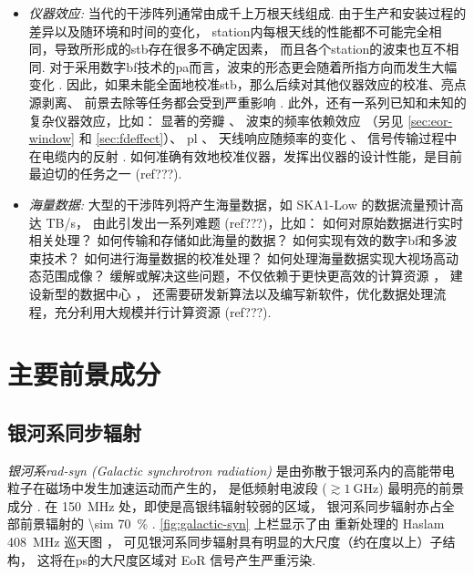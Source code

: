 \begin{itemize}
\item
\emph{仪器效应:}
当代的干涉阵列通常由成千上万根天线组成. 由于生产和安装过程的差异以及随环境和时间的变化，
\ac{station}内每根天线的性能都不可能完全相同，导致所形成的\ac{stb}存在很多不确定因素，
而且各个\ac{station}的波束也互不相同.
对于采用数字\ac{bf}技术的\ac{pa}而言，波束的形态更会随着所指方向而发生大幅变化
\cite{smirnov2011iii,vanWeeren2016,jagannathan2017}.
因此，如果未能全面地校准\ac{stb}，那么后续对其他仪器效应的校准、亮点源剥离、
前景去除等任务都会受到严重影响 \cite{noordam2004,neben2016}.
此外，还有一系列已知和未知的复杂仪器效应，比如：
显著的旁瓣 \cite{thyagarajan2015,mort2017}、
波束的频率依赖效应 \cite{liu2009ps,datta2010,morales2012}
（另见 \autoref{sec:eor-window} 和 \autoref{sec:fdeffect}）、
\ac{pl} \cite{asad2015,asad2016,asad2018,lenc2017}、
天线响应随频率的变化 \cite{bernardi2015,trott2017}、
信号传输过程中在电缆内的反射 \cite{beardsley2016}.
如何准确有效地校准仪器，发挥出仪器的设计性能，是目前最迫切的任务之一
\cite{wijnholds2010} (ref???).

\item
\emph{海量数据:}
大型的干涉阵列将产生海量数据，如 SKA1-Low 的数据流量预计高达 TB/s，
由此引发出一系列难题 \cite{norris2011} (ref???)，比如：
如何对原始数据进行实时相关处理？
如何传输和存储如此海量的数据？
如何实现有效的数字\ac{bf}和多波束技术？
如何进行海量数据的校准处理？
如何处理海量数据实现大视场高动态范围成像？
缓解或解决这些问题，不仅依赖于更快更高效的计算资源 \cite{magro2014,vermij2017}，
建设新型的数据中心 \cite{chrysostomou2018}，
还需要研发新算法以及编写新软件，优化数据处理流程，充分利用大规模并行计算资源
\cite{morales2009,gunst2018} (ref???).

\end{itemize}


\section{主要前景成分}
\label{sec:fg-intro}

\subsection{银河系同步辐射}

\emph{银河系\acs{rad-syn} (Galactic synchrotron radiation)}
是由弥散于银河系内的高能带电粒子在磁场中发生加速运动而产生的，
是低频射电波段 ($\gtrsim \SI{1}{\GHz}$) 最明亮的前景成分
\cite{bernardi2009,ghosh2012}.
在 \SI{150}{\MHz} 处，即使是高银纬辐射较弱的区域，
银河系同步辐射亦占全部前景辐射的 \SI{\sim 70}{\percent} \cite{shaver1999}.
\autoref{fig:galactic-syn} 上栏显示了由 
重新处理的 Haslam \SI{408}{\MHz} 巡天图 \cite{haslam1982}，
可见银河系同步辐射具有明显的大尺度（约在度以上）子结构，
这将在\ac{ps}的大尺度区域对 EoR 信号产生严重污染.

